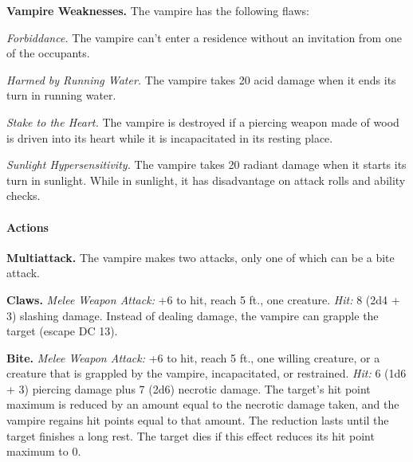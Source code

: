 \documentclass[
]{article}
\begin{document}
\textbf{Vampire Weaknesses.} The vampire has the following flaws:

\emph{Forbiddance.} The vampire can't enter a residence without an
invitation from one of the occupants.

\emph{Harmed by Running Water.} The vampire takes 20 acid damage when it
ends its turn in running water.

\emph{Stake to the Heart.} The vampire is destroyed if a piercing weapon
made of wood is driven into its heart while it is incapacitated in its
resting place.

\emph{Sunlight Hypersensitivity.} The vampire takes 20 radiant damage
when it starts its turn in sunlight. While in sunlight, it has
disadvantage on attack rolls and ability checks.

\hypertarget{actions-1}{%
\paragraph{Actions}\label{actions-1}}

\textbf{Multiattack.} The vampire makes two attacks, only one of which
can be a bite attack.

\textbf{Claws.} \emph{Melee Weapon Attack:} +6 to hit, reach 5 ft., one
creature. \emph{Hit:} 8 (2d4 + 3) slashing damage. Instead of dealing
damage, the vampire can grapple the target (escape DC 13).

\textbf{Bite.} \emph{Melee Weapon Attack:} +6 to hit, reach 5 ft., one
willing creature, or a creature that is grappled by the vampire,
incapacitated, or restrained. \emph{Hit:} 6 (1d6 + 3) piercing damage
plus 7 (2d6) necrotic damage. The target's hit point maximum is reduced
by an amount equal to the necrotic damage taken, and the vampire regains
hit points equal to that amount. The reduction lasts until the target
finishes a long rest. The target dies if this effect reduces its hit
point maximum to 0.
\end{document}
